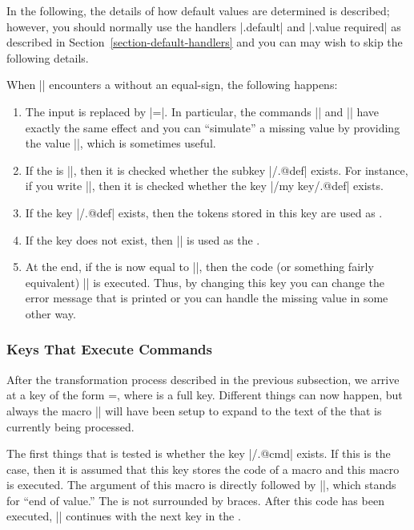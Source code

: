 In the following, the details of how default values are determined is
described; however, you should normally use the handlers |.default|
and |.value required| as described in
Section~\ref{section-default-handlers} and you can may wish to skip
the following details.

When |\pgfkeys| encounters a  without an equal-sign, the
following happens:
\begin{enumerate}
\item The input is replaced by |=\pgfkeysnovalue|. In
  particular, the commands || and
  || have exactly the same effect and
  you can ``simulate'' a missing value by providing the value
  |\pgfkeysnovalue|, which is sometimes useful. 
\item If the  is |\pgfkeysnovalue|, then it is checked
  whether the subkey |/.@def| exists. For instance, if you
  write ||, then it is checked whether the key
  |/my key/.@def| exists.
\item If the key |/.@def| exists, then the tokens stored in
  this key are used as .
\item If the key does not exist, then |\pgfkeysnovalue| is used as the
  .
\item At the end, if the  is now equal to
  |\pgfkeysvaluerequired|, then the code  (or something fairly equivalent)
  ||
  is executed. Thus, by changing this key you can change the error
  message that is printed or you can handle the missing value in some
  other way.
\end{enumerate}



\subsubsection{Keys That Execute Commands}
\label{section-key-code}

After the transformation process described in the previous subsection,
we arrive at a key of the form =, where
 is a full key. Different things can now happen, but always
the macro |\pgfkeyscurrentkey| will have been setup to expand to the
text of the  that is currently being processed.

The first things that is tested is whether the key |/.@cmd|
exists. If this is the case, then it is assumed that this key stores
the code of a macro and this macro is executed. The argument of this
macro is  directly followed by |\pgfeov|, which stands for
``end of value.'' The  is not surrounded by braces. After
this code has been executed, |\pgfkeys| continues with the next key in
the .

